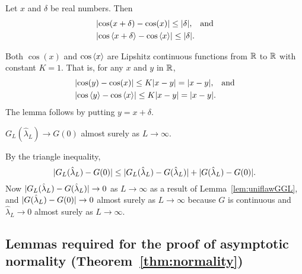 \documentclass[journal]{IEEEtran}
\begin{document}
\begin{lemma}\label{lem:coslipshitz}
Let $x$ and $\delta$ be real numbers.  Then
\begin{align*}
&{\left\vert \cos(x + \delta) - \cos(x) \right\vert} \leq {\left\vert \delta \right\vert}, \;\;\; \text{and} \\
&{\left\vert \cos\left\langle x + \delta \right\rangle - \cos\left\langle x \right\rangle \right\vert} \leq {\left\vert \delta \right\vert}.
\end{align*}
\end{lemma}
\begin{IEEEproof}
Both $\cos(x)$ and $\cos\left\langle x \right\rangle$ are Lipshitz continuous functions from ${\mathbb R}$ to ${\mathbb R}$ with constant $K=1$.  That is, for any $x$ and $y$ in ${\mathbb R}$,
\begin{align*}
&{\left\vert \cos(y) - \cos(x) \right\vert} \leq K{\left\vert x-y \right\vert} = {\left\vert x-y \right\vert}, \;\;\; \text{and} \\
&{\left\vert \cos\left\langle y \right\rangle - \cos\left\langle x \right\rangle \right\vert} \leq K{\left\vert x-y \right\vert} = {\left\vert x-y \right\vert}.
\end{align*}
 The lemma follows by putting $y = x + \delta$.
\end{IEEEproof}


\begin{lemma}\label{lem:GLtoG0}
$G_L(\hat{\lambda}_L) \rightarrow G(0)$ almost surely as $L \rightarrow \infty$.
\end{lemma}
\begin{IEEEproof}
By the triangle inequality,
\[
{\vert G_L(\hat{\lambda}_L) - G(0) \vert} \leq {\vert G_L(\hat{\lambda}_L) - G(\hat{\lambda}_L) \vert} + {\vert G(\hat{\lambda}_L) - G(0) \vert}.
\]
Now ${\vert G_L(\hat{\lambda}_L) - G(\hat{\lambda}_L) \vert} \rightarrow 0$ as $L \rightarrow \infty$ as a result of Lemma~\ref{lem:uniflawGGL}, and ${\vert G(\hat{\lambda}_L) - G(0) \vert} \rightarrow 0$ almost surely as $L \rightarrow \infty$ because $G$ is continuous and $\hat{\lambda}_L \rightarrow 0$ almost surely as $L \rightarrow \infty$.
\end{IEEEproof}


\subsection{Lemmas required for the proof of asymptotic normality (Theorem~\ref{thm:normality}) } \label{sec:proof-asympt-normappendix}
\end{document}
